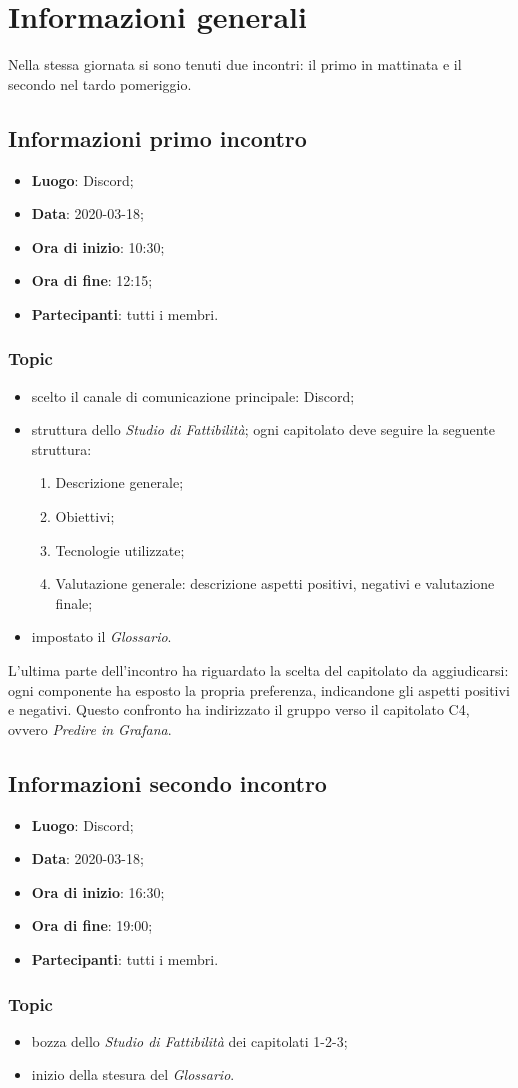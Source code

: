 \section{Informazioni generali}
Nella stessa giornata si sono tenuti due incontri: il primo in mattinata e il secondo nel tardo pomeriggio.
\subsection{Informazioni primo incontro}
\begin{itemize}
\item \textbf{Luogo}: Discord\glo;
\item \textbf{Data}: 2020-03-18;
\item \textbf{Ora di inizio}: 10:30;
\item \textbf{Ora di fine}: 12:15;
\item \textbf{Partecipanti}: tutti i membri.
\end{itemize}

\subsubsection{Topic}
\begin{itemize}
\item scelto il canale di comunicazione principale: Discord;
\item struttura dello \textit{Studio di Fattibilità}; ogni capitolato deve seguire la seguente struttura: \begin{enumerate}
\item Descrizione generale;
\item Obiettivi;
\item Tecnologie utilizzate;
\item Valutazione generale: descrizione aspetti positivi, negativi e valutazione finale;
\end{enumerate}
\item impostato il \textit{Glossario}.
\end{itemize}

L'ultima parte dell'incontro ha riguardato la scelta del capitolato da aggiudicarsi: ogni componente ha esposto la propria preferenza, indicandone gli aspetti positivi e negativi. Questo confronto ha indirizzato il gruppo verso il capitolato C4, ovvero \textit{Predire in Grafana}.
\pagebreak

\subsection{Informazioni secondo incontro}
\begin{itemize}
\item \textbf{Luogo}: Discord;
\item \textbf{Data}: 2020-03-18;
\item \textbf{Ora di inizio}: 16:30;
\item \textbf{Ora di fine}: 19:00;
\item \textbf{Partecipanti}: tutti i membri.
\end{itemize}

\subsubsection{Topic}
\begin{itemize}
\item bozza dello \textit{Studio di Fattibilità} dei capitolati 1-2-3;
\item inizio della stesura del \textit{Glossario}.
\end{itemize}